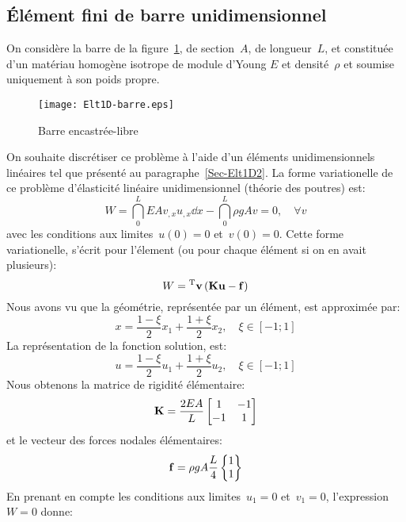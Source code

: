   \subsection{Élément fini de barre unidimensionnel}\label{Sec-barre1D}
\fi
On considère la barre de la figure~\ref{fig-barre}, de section~$A$, de longueur~$L$, et constituée 
d'un matériau homogène isotrope de module d'Young 
$E$ et densité~$\rho$ et soumise uniquement à son poids propre.\\
\begin{figure}[ht]
\centering
\texttt{[image: Elt1D-barre.eps]}
\caption{Barre encastrée-libre}\label{fig-barre}
\end{figure}
On souhaite discrétiser ce problème à l'aide d'un éléments unidimensionnels linéaires
tel que présenté au paragraphe~\ref{Sec-Elt1D2}.
\medskipvm
La forme variationelle de ce problème d'élasticité linéaire unidimensionnel (théorie des poutres) est:
\begin{equation}
W=\dint_0^L EA v_{,x}u_{,x} \dd x - \dint_0^L \rho g A v = 0, \quad \forall v
\end{equation}
avec les conditions aux limites~$u(0)=0$ et~$v(0)=0$.
Cette forme variationelle, s'écrit pour l'élement (ou pour chaque élément si on en avait plusieurs):
\begin{equation}
W = \LL{v} \left( \MM{K}\VV{u} - \VV{f} \right)
\end{equation}
\medskipvm
Nous avons vu que la géométrie, représentée par un élément, est approximée par:
\begin{equation} x=\frac{1-\xi}2 x_1 + \frac{1+\xi}2 x_2, \quad \xi\in[-1;1] \end{equation}
La représentation de la fonction solution, est:
\begin{equation} u = \frac{1-\xi}2 u_1 + \frac{1+\xi}2 u_2, \quad \xi\in[-1;1] \end{equation}
\medskipvm
Nous obtenons la matrice de rigidité élémentaire:
\begin{equation} 
\MM{K} = \frac{2EA}L \MM*{1 & -1\\ -1& 1}
\end{equation}
et le vecteur des forces nodales élémentaires:
\begin{equation} 
\VV{f} = \rho g A \frac{L}4 \VV*{1 \\1}
\end{equation}
\medskipvm
En prenant en compte les conditions aux limites~$u_1=0$ et~$v_1=0$, l'expression~$W=0$ donne:

